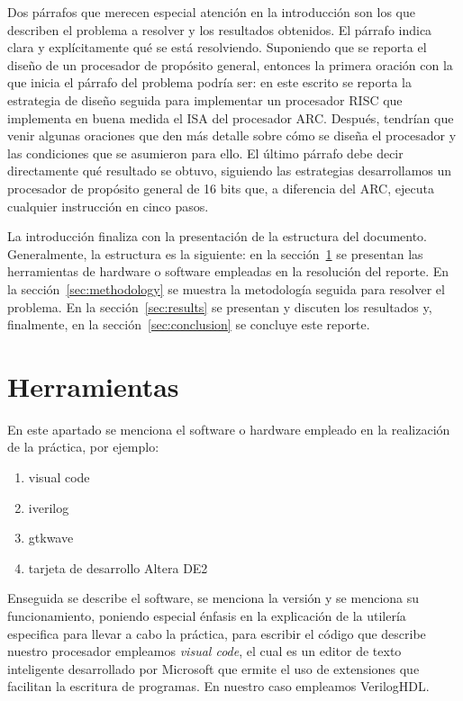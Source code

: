 \documentclass[12pt]{article}
\begin{document}
Dos párrafos que merecen especial atención en la introducción son los que 
describen el problema a resolver y los resultados obtenidos. El párrafo indica 
clara y explícitamente qué se está resolviendo. Suponiendo que se reporta el 
diseño de un procesador de propósito general, entonces la primera oración con 
la que inicia el párrafo del problema podría ser: en este escrito se reporta la 
estrategia de diseño seguida para implementar un procesador RISC que implementa 
en buena medida el ISA del procesador ARC. Después, tendrían que venir algunas 
oraciones que den más detalle sobre cómo se diseña el procesador y las 
condiciones que se asumieron para ello. El último párrafo debe decir 
directamente qué resultado se obtuvo, \eg siguiendo las estrategias 
desarrollamos un procesador de propósito general de 16 bits que, a diferencia 
del ARC, ejecuta cualquier instrucción en cinco pasos.

La introducción finaliza con la presentación de la estructura del documento. 
Generalmente, la estructura es la siguiente: en la sección~\ref{sec:tools} se 
presentan las herramientas de hardware o software empleadas en la resolución 
del reporte. En la sección~\ref{sec:methodology} se muestra la metodología 
seguida para resolver el problema. En la sección~\ref{sec:results} se 
presentan y discuten los resultados y, finalmente, en la 
sección~\ref{sec:conclusion} se concluye este reporte.


\section{Herramientas}\label{sec:tools}

En este apartado se menciona el software o hardware empleado en la realización 
de la práctica, por ejemplo:
\begin{enumerate}
    \item visual code
    \item iverilog
    \item gtkwave
    \item tarjeta de desarrollo Altera DE2
\end{enumerate}

Enseguida se describe el software, se menciona la versión y se menciona su 
funcionamiento, poniendo especial énfasis en la explicación de la utilería 
especifica para llevar a cabo la práctica, \eg para escribir el código que 
describe nuestro procesador empleamos \textit{visual code}, el cual es un editor 
de texto inteligente desarrollado por Microsoft que ermite el uso de extensiones 
que facilitan la escritura de programas. En nuestro caso empleamos VerilogHDL.
\end{document}
